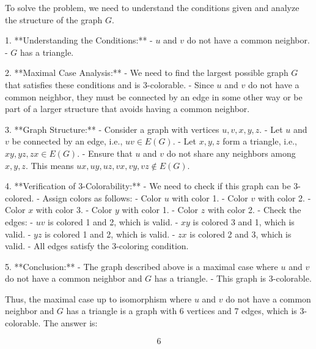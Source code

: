 To solve the problem, we need to understand the conditions given and analyze the structure of the graph \( G \).

1. **Understanding the Conditions:**
   - \( u \) and \( v \) do not have a common neighbor.
   - \( G \) has a triangle.

2. **Maximal Case Analysis:**
   - We need to find the largest possible graph \( G \) that satisfies these conditions and is 3-colorable.
   - Since \( u \) and \( v \) do not have a common neighbor, they must be connected by an edge in some other way or be part of a larger structure that avoids having a common neighbor.

3. **Graph Structure:**
   - Consider a graph with vertices \( u, v, x, y, z \).
   - Let \( u \) and \( v \) be connected by an edge, i.e., \( uv \in E(G) \).
   - Let \( x, y, z \) form a triangle, i.e., \( xy, yz, zx \in E(G) \).
   - Ensure that \( u \) and \( v \) do not share any neighbors among \( x, y, z \). This means \( ux, uy, uz, vx, vy, vz \notin E(G) \).

4. **Verification of 3-Colorability:**
   - We need to check if this graph can be 3-colored.
   - Assign colors as follows:
     - Color \( u \) with color 1.
     - Color \( v \) with color 2.
     - Color \( x \) with color 3.
     - Color \( y \) with color 1.
     - Color \( z \) with color 2.
   - Check the edges:
     - \( uv \) is colored 1 and 2, which is valid.
     - \( xy \) is colored 3 and 1, which is valid.
     - \( yz \) is colored 1 and 2, which is valid.
     - \( zx \) is colored 2 and 3, which is valid.
   - All edges satisfy the 3-coloring condition.

5. **Conclusion:**
   - The graph described above is a maximal case where \( u \) and \( v \) do not have a common neighbor and \( G \) has a triangle.
   - This graph is 3-colorable.

Thus, the maximal case up to isomorphism where \( u \) and \( v \) do not have a common neighbor and \( G \) has a triangle is a graph with 6 vertices and 7 edges, which is 3-colorable. The answer is:

\[
\boxed{6}
\]